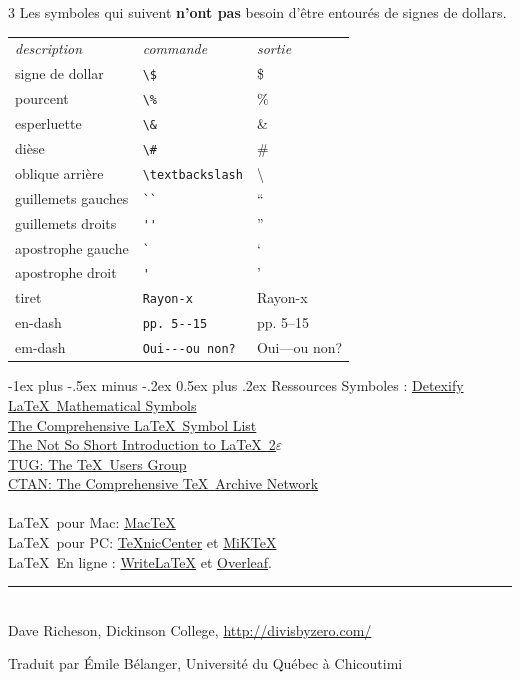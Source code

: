 \documentclass[10pt,landscape]{article}
\makeatletter
\renewcommand{\section}{\@startsection{section}{1}{0mm}%
                                {-1ex plus -.5ex minus -.2ex}%
                                {0.5ex plus .2ex}%
                                {\normalfont\large\bfseries}}
\makeatother
\begin{document}
\begin{multicols}{3}
Les symboles qui suivent \textbf{n'ont pas} besoin d'être entourés de signes de dollars.

\begin{tabular}{lll}
\emph{description} & \emph{commande} & \emph{sortie}\\
signe de dollar & \verb!\$! & \$ \\
pourcent & \verb!\%! & \% \\
esperluette & \verb!\&! & \& \\
dièse & \verb!\#! & \# \\
oblique arrière & \verb!\textbackslash! & \textbackslash \\
guillemets gauches & \verb!``! & `` \\
guillemets droits & \verb!''! & '' \\
apostrophe gauche  & \verb!`! & ` \\
apostrophe droit  & \verb!'! & ' \\
tiret & \verb!Rayon-x! & Rayon-x\\
en-dash & \verb!pp. 5--15! & pp. 5--15 \\
em-dash & \verb!Oui---ou non?! & Oui---ou non? 
\end{tabular}

\section{Ressources}
Symboles : \href{http://detexify.kirelabs.org/}{Detexify}\\
\href{http://amath.colorado.edu/documentation/LaTeX/Symbols.pdf}{\LaTeX\ Mathematical Symbols}\\
\href{ftp://tug.ctan.org/pub/tex-archive/info/symbols/comprehensive/symbols-letter.pdf}{The Comprehensive \LaTeX\ Symbol List}\\ 
\href{http://mirrors.med.harvard.edu/ctan/info/lshort/english/lshort.pdf}{The Not So Short Introduction to \LaTeX\ 2$\varepsilon$}\\
\href{http://www.tug.org/}{TUG: The \TeX\ Users Group}\\
\href{http://www.ctan.org/}{CTAN: The Comprehensive \TeX\ Archive Network}\\
~\\
\LaTeX\ pour Mac: \href{http://www.tug.org/mactex/}{Mac\TeX}\\
\LaTeX\ pour PC: \href{http://www.texniccenter.org/}{{\TeX}nicCenter} et \href{http://miktex.org/}{MiK\TeX}\\
\LaTeX\ En ligne : \href{http://www.writelatex.com/}{WriteLaTeX} et \href{https://www.overleaf.com/}{Overleaf}.
\vfill
\hrule
~\\
Dave Richeson, Dickinson College, \href{http://divisbyzero.com/}{http://divisbyzero.com/}

Traduit par Émile Bélanger, Université du Québec à Chicoutimi
\end{multicols} 
\end{document}
